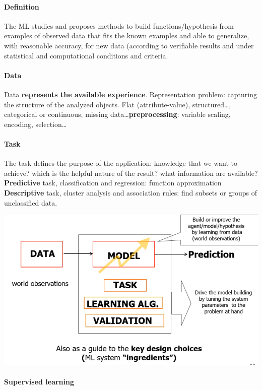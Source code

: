 \documentclass[10pt]{report}
\begin{document}
\paragraph{Definition} The ML studies and proposes methods to build functions/hypothesis from examples of observed data that fits the known examples and able to generalize, with reasonable accuracy, for new data (according to verifiable results and under statistical and computational conditions and criteria.
\paragraph{Data} Data \textbf{represents the available experience}. Representation problem: capturing the structure of the analyzed objects. Flat (attribute-value), structured\ldots, categorical or continuous, missing data\ldots \textbf{preprocessing}: variable scaling, encoding, selection\ldots
\paragraph{Task} The task defines the purpose of the application: knowledge that we want to achieve? which is the helpful nature of the result? what information are available?\\
\textbf{Predictive} task, classification and regression: function approximation\\
\textbf{Descriptive} task, cluster analysis and association rules: find subsets or groups of unclassified data.
\begin{center}
	\includegraphics[scale=0.25]{1.png}
\end{center}
\paragraph{Supervised learning} %
\end{document}
